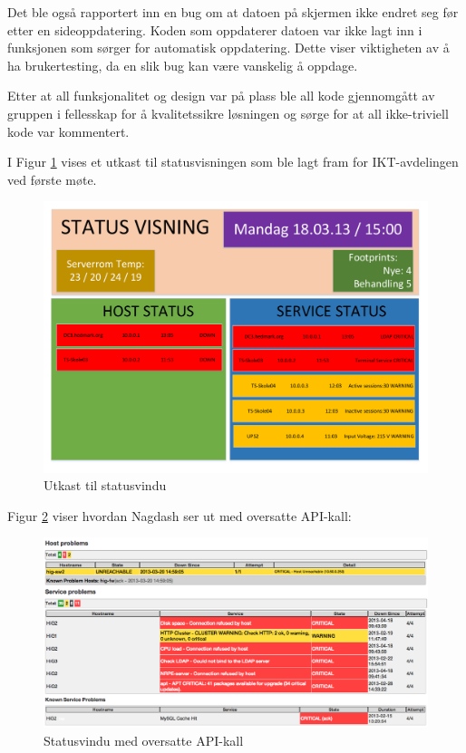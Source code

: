 Det ble også rapportert inn en bug om at datoen på skjermen ikke endret seg før etter en sideoppdatering. Koden som oppdaterer datoen var ikke lagt inn i funksjonen som sørger for automatisk oppdatering. Dette viser viktigheten av å ha brukertesting, da en slik bug kan være vanskelig å oppdage.

Etter at all funksjonalitet og design var på plass ble all kode gjennomgått av gruppen i fellesskap for å kvalitetssikre løsningen og sørge for at all ikke-triviell kode var kommentert.

I Figur \ref{statusvindu_utkast} vises et utkast til statusvisningen som ble lagt fram for IKT-avdelingen ved første møte.

\begin{figure}[H]
    \centering
    \includegraphics[scale=0.3]{img/statusvindu_mockup}
    \caption{Utkast til statusvindu}
    \label{statusvindu_utkast}
\end{figure}

Figur \ref{statusvindu_oversatte_kall} viser hvordan Nagdash ser ut med oversatte API-kall:
\begin{figure}[H]
    \centering
    \includegraphics[scale=0.3]{img/statusvindu_oversatte_kall}
    \caption{Statusvindu med oversatte API-kall}
    \label{statusvindu_oversatte_kall}
\end{figure}

